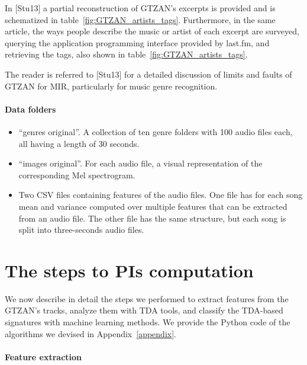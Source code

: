 \documentclass[english, LaM, oneside, noexaminfo]{sapthesis}
\begin{document}
In [Stu13] a partial reconstruction of GTZAN's excerpts is provided and is schematized in table~\ref{fig:GTZAN_artists_tags}. Furthermore, in the same article, the ways people describe the music or artist of each excerpt are surveyed, querying the application programming interface provided by last.fm, and retrieving the tags, also shown in table~\ref{fig:GTZAN_artists_tags}. 

The reader is referred to [Stu13] for a detailed discussion of limits and faults of GTZAN for MIR, particularly for music genre recognition.

\paragraph{Data folders}
\begin{itemize}
    \item ``genres original''. A collection of ten genre folders with 100 audio files each, all having a length of 30 seconds.
    \item ``images original''. For each audio file, a visual representation of the corresponding Mel spectrogram.
    \item Two CSV files containing features of the audio files. One file has for each song mean and variance computed over multiple features that can be extracted from an audio file. The other file has the same structure, but each song is split into three-seconds audio files.
\end{itemize}

\section{The steps to PIs computation}

We now describe in detail the steps we performed to extract features from the GTZAN’s tracks, analyze them with TDA tools, and classify the TDA-based signatures with machine learning methods. We provide the Python code of the algorithms we devised in Appendix~\ref{appendix}.

\paragraph{Feature extraction}
\end{document}
